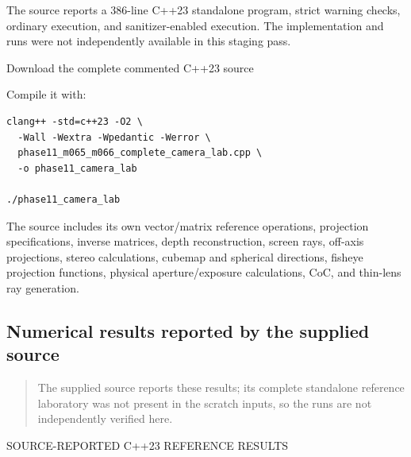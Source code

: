 The source reports a 386-line C++23 standalone program, strict warning checks, ordinary execution, and sanitizer-enabled execution. The implementation and runs were not independently available in this staging pass.

Download the complete commented C++23 source

Compile it with:

\begin{verbatim}
clang++ -std=c++23 -O2 \
  -Wall -Wextra -Wpedantic -Werror \
  phase11_m065_m066_complete_camera_lab.cpp \
  -o phase11_camera_lab

./phase11_camera_lab
\end{verbatim}

The source includes its own vector/matrix reference operations, projection specifications, inverse matrices, depth reconstruction, screen rays, off-axis projections, stereo calculations, cubemap and spherical directions, fisheye projection functions, physical aperture/exposure calculations, CoC, and thin-lens ray generation.

\subsection{Numerical results reported by the supplied source}\label{02-foundations-ii-ch037-numerical-results-reported-by-the-supplied-source}

\begin{quote}
The supplied source reports these results; its complete standalone reference laboratory was not present in the scratch inputs, so the runs are not independently verified here.
\end{quote}

SOURCE-REPORTED C++23 REFERENCE RESULTS

